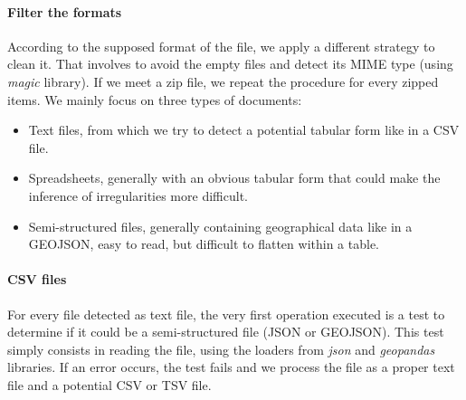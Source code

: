 \documentclass[a4paper]{article}
\begin{document}
	
	\paragraph{Filter the formats}
	
	According to the supposed format of the file, we apply a different strategy to clean it. That involves to avoid the empty files and detect its MIME type (using \emph{magic} library). If we meet a zip file, we repeat the procedure for every zipped items. We mainly focus on three types of documents:
	\begin{itemize}
		\item Text files, from which we try to detect a potential tabular form like in a CSV file.
		\item Spreadsheets, generally with an obvious tabular form that could make the inference of irregularities more difficult. 
		\item Semi-structured files, generally containing geographical data like in a GEOJSON, easy to read, but difficult to flatten within a table.
	\end{itemize}
	
	\paragraph{CSV files}
	
	For every file detected as text file, the very first operation executed is a test to determine if it could be a semi-structured file (JSON or GEOJSON). This test simply consists in reading the file, using the loaders from \emph{json} and \emph{geopandas} libraries. If an error occurs, the test fails and we process the file as a proper text file and a potential CSV or TSV file.
	
\end{document}
